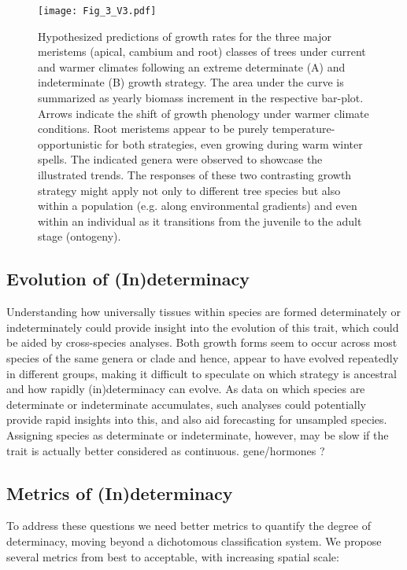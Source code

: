 \documentclass{article}
\begin{document}
							\begin{figure}
							\centering
							\texttt{[image: Fig\_3\_V3.pdf]} 
							\caption{Hypothesized predictions of growth rates for the three major meristems (apical, cambium and root) classes of trees under current and warmer climates following an extreme determinate (A) and indeterminate (B) growth strategy. The area under the curve is summarized as yearly biomass increment in the respective bar-plot. Arrows indicate the shift of growth phenology under warmer climate conditions. Root meristems appear to be purely temperature-opportunistic for both strategies, even growing during warm winter spells. The indicated genera were observed to showcase the illustrated trends. The responses of these two contrasting growth strategy might apply not only to different tree species but also within a population (e.g. along environmental gradients) and even within an individual as it transitions from the juvenile to the adult stage (ontogeny).}
							\label{fig:fig_3xxx}
						\end{figure}

	\subsection*{Evolution of (In)determinacy}
	Understanding how universally tissues within species are formed determinately or indeterminately could provide insight into the evolution of this trait, which could be aided by cross-species analyses. Both growth forms seem to occur across most species of the same genera or clade and hence, appear to have evolved repeatedly in different groups, making it difficult to speculate on which strategy is ancestral \citep[but see][]{hariharanIndeterminateGrowthCould2016} and how rapidly (in)determinacy can evolve. As data on which species are determinate or indeterminate accumulates, such analyses could potentially provide rapid insights into this, and also aid forecasting for unsampled species. Assigning species as determinate or indeterminate, however, may be slow if the trait is actually better considered as continuous. 
	gene/hormones ?
	
	\subsection*{Metrics of (In)determinacy}
	To address these questions we need better metrics to quantify the degree of determinacy, moving beyond a dichotomous classification system. We propose several metrics from best to acceptable, with increasing spatial scale: \\
	
\end{document}
